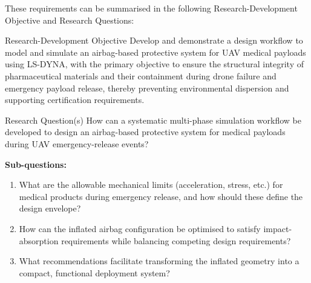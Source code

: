 These requirements can be summarised in the following Research-Development Objective and Research Questions:

\begin{objectivebox}{Research-Development Objective}
Develop and demonstrate a design workflow to model and simulate an airbag-based protective system for UAV medical payloads using LS-DYNA, with the primary objective to ensure the structural integrity of pharmaceutical materials and their containment during drone failure and emergency payload release, thereby preventing environmental dispersion and supporting certification requirements.
\end{objectivebox}

\begin{objectivebox}{Research Question(s)}
How can a systematic multi-phase simulation workflow be developed to design an airbag-based protective system for medical payloads during UAV emergency-release events?

\textbf{Sub-questions:}
\begin{enumerate}
    \item What are the allowable mechanical limits (acceleration, stress, etc.) for medical products during emergency release, and how should these define the design envelope?
    \item How can the inflated airbag configuration be optimised to satisfy impact-absorption requirements while balancing competing design requirements?
    \item What recommendations facilitate transforming the inflated geometry into a compact, functional deployment system?
\end{enumerate}
\end{objectivebox}

